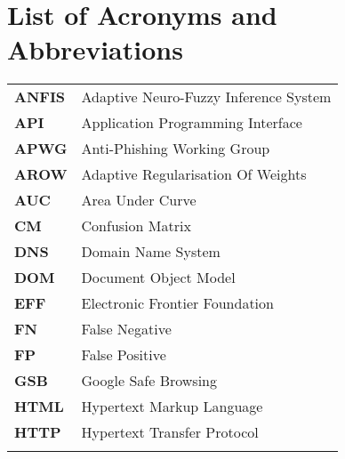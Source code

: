 \chapter*{List of Acronyms and Abbreviations}
\begin{singlespace}
	\begin{table}[!h]
		\large
		\begin{tabular}{  m{10em}  m{22em}  }
			\textbf{ANFIS}  & Adaptive Neuro-Fuzzy Inference System     \\\addlinespace

			\textbf{API}    & Application Programming Interface         \\\addlinespace

			\textbf{APWG}   & Anti-Phishing Working Group               \\\addlinespace

			\textbf{AROW}   & Adaptive Regularisation Of Weights        \\\addlinespace

			\textbf{AUC}    & Area Under Curve                          \\\addlinespace

			\textbf{CM}     & Confusion Matrix                          \\\addlinespace

			\textbf{DNS}    & Domain Name System                        \\\addlinespace

			\textbf{DOM}    & Document Object Model                     \\\addlinespace

			\textbf{EFF}    & Electronic Frontier Foundation            \\\addlinespace

			\textbf{FN}     & False Negative                            \\\addlinespace

			\textbf{FP}     & False Positive                            \\\addlinespace

			\textbf{GSB}    & Google Safe Browsing                      \\\addlinespace

			\textbf{HTML}   & Hypertext Markup Language                 \\\addlinespace

			\textbf{HTTP}   & Hypertext Transfer Protocol               \\\addlinespace


\end{tabular}
\end{table}
\end{singlespace}
